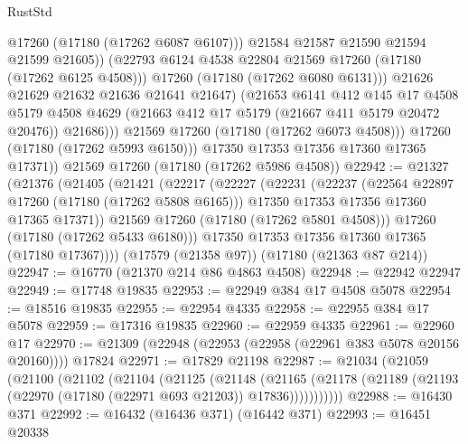 \begin{lexlean}{RustStd}
\begin{coremodule}
                          @17260
                          (@17180 (@17262 @6087 @6107)))
                        @21584
                        @21587
                        @21590
                        @21594
                        @21599
                        @21605))
                    (@22793 @6124 @4538 @22804 @21569 @17260 (@17180 (@17262 @6125 @4508)))
                    @17260
                    (@17180 (@17262 @6080 @6131)))
                  @21626
                  @21629
                  @21632
                  @21636
                  @21641
                  @21647)
                (@21653
                  @6141
                  @412
                  @145
                  @17
                  @4508
                  @5179
                  @4508
                  @4629
                  (@21663 @412 @17 @5179 (@21667 @411 @5179 @20472 @20476))
                  @21686)))
            @21569
            @17260
            (@17180 (@17262 @6073 @4508)))
          @17260
          (@17180 (@17262 @5993 @6150)))
        @17350
        @17353
        @17356
        @17360
        @17365
        @17371))
    @21569
    @17260
    (@17180 (@17262 @5986 @4508))
@22942 := @21327
    (@21376
      (@21405
        (@21421
          (@22217
            (@22227
              (@22231
                (@22237
                  (@22564 @22897 @17260 (@17180 (@17262 @5808 @6165)))
                  @17350
                  @17353
                  @17356
                  @17360
                  @17365
                  @17371))
              @21569
              @17260
              (@17180 (@17262 @5801 @4508)))
            @17260
            (@17180 (@17262 @5433 @6180)))
          @17350
          @17353
          @17356
          @17360
          @17365
          (@17180 @17367))))
    (@17579 (@21358 @97))
    (@17180 (@21363 @87 @214))
@22947 := @16770 (@21370 @214 @86 @4863 @4508)
@22948 := @22942 @22947
@22949 := @17748 @19835
@22953 := @22949 @384 @17 @4508 @5078
@22954 := @18516 @19835
@22955 := @22954 @4335
@22958 := @22955 @384 @17 @5078
@22959 := @17316 @19835
@22960 := @22959 @4335
@22961 := @22960 @17
@22970 := @21309 (@22948 (@22953 (@22958 (@22961 @383 @5078 @20156 @20160)))) @17824
@22971 := @17829 @21198
@22987 := @21034
    (@21059
      (@21100
        (@21102
          (@21104
            (@21125
              (@21148
                (@21165
                  (@21178 (@21189 (@21193 (@22970 (@17180 (@22971 @693 @21203)) @17836)))))))))))
@22988 := @16430 @371
@22992 := @16432 (@16436 @371) (@16442 @371)
@22993 := @16451 @20338

\end{coremodule}
\end{lexlean}
